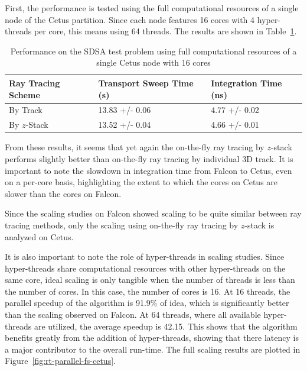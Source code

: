 First, the performance is tested using the full computational resources of a single node of the Cetus partition. Since each node features 16 cores with 4 hyper-threads per core, this means using 64 threads. The results are shown in Table~\ref{tab:rt-full-thread-cetus}.

\begin{table}[ht]
	\centering
	\caption{Performance on the SDSA test problem using full computational resources of a single Cetus node with 16 cores}
	\medskip
	\begin{tabular}{l|l|l}
		\hline
		Ray Tracing Scheme & Transport Sweep Time (s) & Integration Time (ns) \\
		\hline
		By Track & 13.83 +/- 0.06 & 4.77 +/- 0.02 \\
		By $z$-Stack & 13.52 +/- 0.04 & 4.66 +/- 0.01 \\
		\hline
	\end{tabular}
	\label{tab:rt-full-thread-cetus}
\end{table}

From these results, it seems that yet again the on-the-fly ray tracing by $z$-stack performs slightly better than on-the-fly ray tracing by individual 3D track. It is important to note the slowdown in integration time from Falcon to Cetus, even on a per-core basis, highlighting the extent to which the cores on Cetus are slower than the cores on Falcon. 

Since the scaling studies on Falcon showed scaling to be quite similar between ray tracing methods, only the scaling using on-the-fly ray tracing by $z$-stack is analyzed on Cetus. 

It is also important to note the role of hyper-threads in scaling studies. Since hyper-threads share computational resources with other hyper-threads on the same core, ideal scaling is only tangible when the number of threads is less than the number of cores. In this case, the number of cores is 16. At 16 threads, the parallel speedup of the algorithm is 91.9\% of idea, which is significantly better than the scaling observed on Falcon. At 64 threads, where all available hyper-threads are utilized, the average speedup is 42.15. This shows that the algorithm benefits greatly from the addition of hyper-threads, showing that there latency is a major contributor to the overall run-time. The full scaling results are plotted in Figure~\ref{fig:rt-parallel-fs-cetus}.

